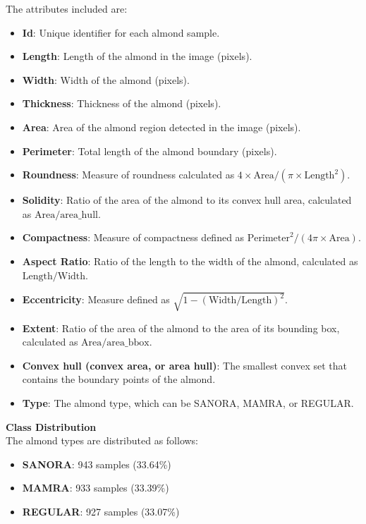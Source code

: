 \documentclass[conference]{IEEEtran}
\begin{document}
The attributes included are:
\begin{itemize}
    \item \textbf{Id}: Unique identifier for each almond sample.
    \item \textbf{Length}: Length of the almond in the image (pixels).
    \item \textbf{Width}: Width of the almond (pixels).
    \item \textbf{Thickness}: Thickness of the almond (pixels).
    \item \textbf{Area}: Area of the almond region detected in the image (pixels).
    \item \textbf{Perimeter}: Total length of the almond boundary (pixels).
    \item \textbf{Roundness}: Measure of roundness calculated as \(4 \times \text{Area} / (\pi \times \text{Length}^2)\).
    \item \textbf{Solidity}: Ratio of the area of the almond to its convex hull area, calculated as \(\text{Area} / \text{area\_hull}\).
    \item \textbf{Compactness}: Measure of compactness defined as \(\text{Perimeter}^2 / (4 \pi \times \text{Area})\).
    \item \textbf{Aspect Ratio}: Ratio of the length to the width of the almond, calculated as \(\text{Length} / \text{Width}\).
    \item \textbf{Eccentricity}: Measure defined as \(\sqrt{1 - (\text{Width} / \text{Length})^2}\).
    \item \textbf{Extent}: Ratio of the area of the almond to the area of its bounding box, calculated as \(\text{Area} / \text{area\_bbox}\).
    \item \textbf{Convex hull (convex area, or area hull)}: The smallest convex set that contains the boundary points of the almond.
    \item \textbf{Type}: The almond type, which can be SANORA, MAMRA, or REGULAR.\\
\end{itemize}
\textbf{Class Distribution}\\
The almond types are distributed as follows:
\begin{itemize}
	\item \textbf{SANORA}: 943 samples (33.64\%)
	\item \textbf{MAMRA}: 933 samples (33.39\%)
	\item \textbf{REGULAR}: 927 samples (33.07\%)
\end{itemize}
\end{document}

